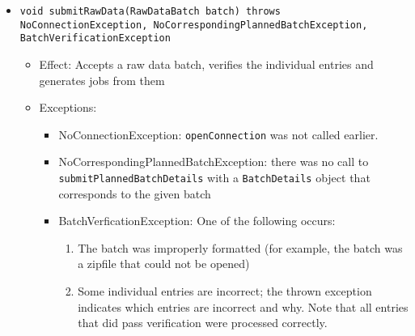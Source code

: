 \begin{itemize}
\begin{itemize}
	    \item \texttt{void submitRawData(RawDataBatch batch) throws NoConnectionException, NoCorrespondingPlannedBatchException, BatchVerificationException}
	     \begin{itemize}
	     	\item Effect: Accepts a raw data batch, verifies the individual entries and generates jobs from them
	     	\item Exceptions:
	     	\begin{itemize}
	     		\item NoConnectionException: \texttt{openConnection} was not called earlier.
	     		\item NoCorrespondingPlannedBatchException: there was no call to \texttt{submitPlannedBatchDetails} with a \texttt{BatchDetails} object that corresponds to the given batch
	     		\item BatchVerficationException: One of the following occurs:
	     		\begin{enumerate}
	     			\item The batch was improperly formatted (for example, the batch was a zipfile that could not be opened)
	     			\item Some individual entries are incorrect; the thrown exception indicates which entries are incorrect and why. Note that all entries that did pass verification were processed correctly.
	     		\end{enumerate} 
	     	\end{itemize}
	     \end{itemize}
    \end{itemize}
    

\end{itemize}
